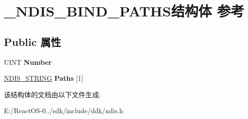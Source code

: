 \hypertarget{struct___n_d_i_s___b_i_n_d___p_a_t_h_s}{}\section{\+\_\+\+N\+D\+I\+S\+\_\+\+B\+I\+N\+D\+\_\+\+P\+A\+T\+H\+S结构体 参考}
\label{struct___n_d_i_s___b_i_n_d___p_a_t_h_s}
\subsection*{Public 属性}
\begin{DoxyCompactItemize}
\item 
\mbox{\label{struct___n_d_i_s___b_i_n_d___p_a_t_h_s_a375f3fb1ba3dfd0ca4be4a564293f716}} 
U\+I\+NT {\bfseries Number}
\item 
\mbox{\label{struct___n_d_i_s___b_i_n_d___p_a_t_h_s_a1fb19a53adda471ae2a6e1b50edf6598}} 
\hyperlink{struct___u_n_i_c_o_d_e___s_t_r_i_n_g}{N\+D\+I\+S\+\_\+\+S\+T\+R\+I\+NG} {\bfseries Paths} \mbox{[}1\mbox{]}
\end{DoxyCompactItemize}


该结构体的文档由以下文件生成\+:\begin{DoxyCompactItemize}
\item 
E\+:/\+React\+O\+S-\/0../sdk/include/ddk/ndis.\+h\end{DoxyCompactItemize}

